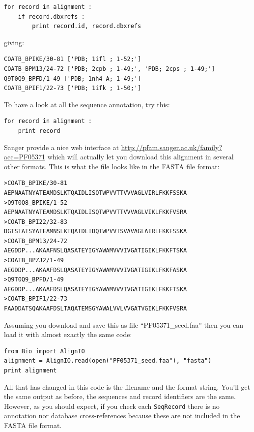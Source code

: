 \documentclass{report}
\begin{document}
\begin{verbatim}
for record in alignment :
    if record.dbxrefs :
        print record.id, record.dbxrefs
\end{verbatim}

\noindent giving:

\begin{verbatim}
COATB_BPIKE/30-81 ['PDB; 1ifl ; 1-52;']
COATB_BPM13/24-72 ['PDB; 2cpb ; 1-49;', 'PDB; 2cps ; 1-49;']
Q9T0Q9_BPFD/1-49 ['PDB; 1nh4 A; 1-49;']
COATB_BPIF1/22-73 ['PDB; 1ifk ; 1-50;']
\end{verbatim}

\noindent To have a look at all the sequence annotation, try this:

\begin{verbatim}
for record in alignment :
    print record
\end{verbatim}


Sanger provide a nice web interface at \url{http://pfam.sanger.ac.uk/family?acc=PF05371} which will actually let you download this alignment in several other formats.  This is what the file looks like in the FASTA file format:

\begin{verbatim}
>COATB_BPIKE/30-81
AEPNAATNYATEAMDSLKTQAIDLISQTWPVVTTVVVAGLVIRLFKKFSSKA
>Q9T0Q8_BPIKE/1-52
AEPNAATNYATEAMDSLKTQAIDLISQTWPVVTTVVVAGLVIKLFKKFVSRA
>COATB_BPI22/32-83
DGTSTATSYATEAMNSLKTQATDLIDQTWPVVTSVAVAGLAIRLFKKFSSKA
>COATB_BPM13/24-72
AEGDDP...AKAAFNSLQASATEYIGYAWAMVVVIVGATIGIKLFKKFTSKA
>COATB_BPZJ2/1-49
AEGDDP...AKAAFDSLQASATEYIGYAWAMVVVIVGATIGIKLFKKFASKA
>Q9T0Q9_BPFD/1-49
AEGDDP...AKAAFDSLQASATEYIGYAWAMVVVIVGATIGIKLFKKFTSKA
>COATB_BPIF1/22-73
FAADDATSQAKAAFDSLTAQATEMSGYAWALVVLVVGATVGIKLFKKFVSRA
\end{verbatim}

\noindent Assuming you download and save this as file ``PF05371\_seed.faa'' then you can load it with almost exactly the same code:

\begin{verbatim}
from Bio import AlignIO
alignment = AlignIO.read(open("PF05371_seed.faa"), "fasta")
print alignment
\end{verbatim}

All that has changed in this code is the filename and the format string.  You'll get the same output as before, the sequences and record identifiers are the same.
However, as you should expect, if you check each \verb|SeqRecord| there is no annotation nor database cross-references because these are not included in the FASTA file format.
\end{document}
